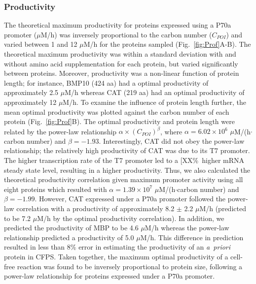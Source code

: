 \documentclass[journal=asbcd6,manuscript=article]{achemso}
\begin{document}
\subsubsection{Productivity}
The theoretical maximum productivity for proteins expressed using a P70a promoter ($\mu$M/h) was inversely proportional to the carbon number ($C_{POI}$) and varied between 1 and 12 $\mu$M/h for the proteins sampled (Fig.~\ref{fig:Prof}A-B).
The theoretical maximum productivity was within a standard deviation with and without amino acid supplementation for each protein, but varied significantly between proteins.
Moreover, productivity was a non-linear function of protein length; for instance, BMP10 (424 aa) had a optimal productivity of approximately 2.5 $\mu$M/h whereas CAT (219 aa) had an optimal productivity of approximately 12 $\mu$M/h.
To examine the influence of protein length further, the mean optimal productivity was plotted against the carbon number of each protein (Fig.~\ref{fig:Prof}B).
The optimal productivity and protein length were related by the power-law relationship $\alpha\times(C_{POI})^{\beta}$, where $\alpha = 6.02\times 10^{6}$ $\mu$M/(h$\cdot$carbon number) and $\beta=-1.93$.
Interestingly, CAT did not obey the power-law relationship; the relatively high productivity of CAT was due to its T7 promoter.
The higher transcription rate of the T7 promoter led to a [XX\%\ higher mRNA steady state level, resulting in a higher productivity.
Thus, we also calculated the theoretical productivity correlation given maximum promoter activity using all eight proteins which resulted with $\alpha = 1.39\times 10^{7}$ $\mu$M/(h$\cdot$carbon number) and $\beta=-1.99$.
However, CAT expressed under a P70a promoter followed the power-law correlation with a productivity of approximately 8.2 $\pm$ 2.2 $\mu$M/h (predicted to be 7.2 $\mu$M/h by the optimal productivity correlation).
In addition, we predicted the productivity of MBP to be 4.6 $\mu$M/h whereas the power-law relationship predicted a productivity of 5.0 $\mu$M/h.
This difference in prediction resulted in less than 8\% error in estimating the productivity of an \emph{a~priori} protein in CFPS.
Taken together, the maximum optimal productivity of a cell-free reaction was found to be inversely proportional to protein size,
following a power-law relationship for proteins expressed under a P70a promoter.

\end{document}
